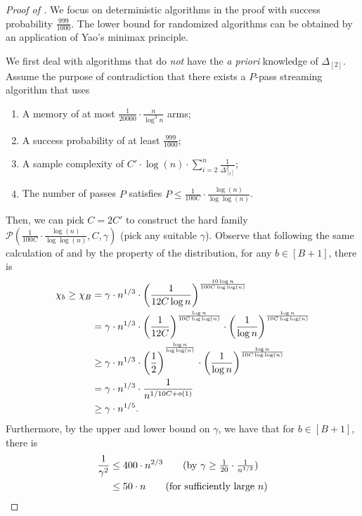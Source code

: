 \begin{proof}[Proof of ]
	We focus on deterministic algorithms in the proof with success probability $\frac{999}{1000}$. The lower bound for randomized algorithms can be obtained by an application of Yao's minimax principle.
	
	We first deal with algorithms that do \emph{not} have the \emph{a priori} knowledge of $\Delta_{[2]}$. Assume the purpose of contradiction that there exists a $P$-pass streaming algorithm that uses
	\begin{enumerate}
		\item A memory of at most $\frac{1}{20000}\cdot \frac{n}{\log^3 n}$ arms;
		\item A success probability of at least $\frac{999}{1000}$;
		\item A sample complexity of $C' \cdot \log(n)\cdot \sum_{i=2}^{n}\frac{1}{\Delta^2_{[i]}}$;
		\item The number of passes $P$ satisfies $P\leq \frac{1}{100C}\cdot \frac{\log(n)}{\log\log(n)}$.
	\end{enumerate}
	Then, we can pick $C=2C'$ to construct the hard family $\mathcal{P}(\frac{1}{100C}\cdot \frac{\log(n)}{\log\log(n)}, C, \gamma)$ (pick any suitable $\gamma$). Observe that following the same calculation of  and by the property of the distribution, for any $b\in[B+1]$, there is
	\begin{align*}
		\chi_{b}\geq \chi_{B} & = \gamma \cdot n^{1/3} \cdot \left(\frac{1}{12 C\log n}\right)^{\frac{10\log n}{100 C\log\log(n)}}\\
		&= \gamma \cdot n^{1/3} \cdot \left(\frac{1}{12C}\right)^{\frac{\log n}{10C \log\log(n)}} \cdot \left(\frac{1}{\log{n}}\right)^{\frac{\log n}{10C \log\log(n)}}\\
		& \geq \gamma \cdot n^{1/3}\cdot \left(\frac{1}{2}\right)^{^{\frac{\log n}{\log\log(n)}}}\cdot \left(\frac{1}{\log n}\right)^{\frac{\log n}{10C \log\log(n)}}\\
		& = \gamma \cdot n^{1/3}\cdot \frac{1}{n^{1/10C + o(1)}}\\
		& \geq \gamma\cdot n^{1/5}.
	\end{align*}
	Furthermore, by the upper and lower bound on $\gamma$, we have that for $b\in[B+1]$, there is
	\begin{align*}
		\frac{1}{\gamma^2} &\leq 400 \cdot n^{2/3} \tag{by $\gamma\geq \frac{1}{20}\cdot \frac{1}{n^{1/3}}$}\\
		&\leq 50 \cdot n \tag{for sufficiently large $n$}\\

\end{align*}
\end{proof}
